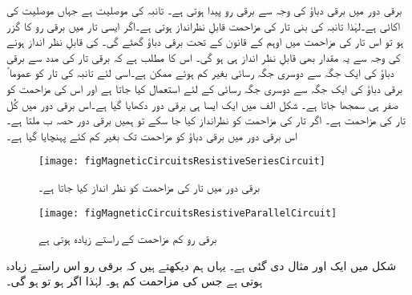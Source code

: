 	برقی دور میں برقی دباؤ    کی وجہ سے برقی رو  پیدا ہوتی ہے۔ تانبہ   کی موصلیت  ہے جہاں  موصلیت کی اکائی ہے۔لہٰذا تانبہ کی بنی تار کی مزاحمت    قابلِ نظرانداز ہوتی ہے۔اگر ایسی تار میں برقی رو  کا گزر ہو  تو اس تار کی مزاحمت میں اوہم کے قانون کے تحت  برقی دباؤ   گھٹے  گی۔ کی قابلِ نظر انداز ہونے کی وجہ سے یہ مقدار بھی قابلِ نظر انداز ہی ہو گی۔ اس کا مطلب ہے کہ برقی تار کی مدد سے برقی دباؤ کی ایک جگہ سے دوسری جگہ رسائی بغیر کم ہوئے ممکن ہے۔اسی لئے تانبہ کی تار کو عموما ً برقی دباؤ کی ایک جگہ سے دوسری جگہ رسائی کے لئے استعمال کیا جاتا ہے اور اس کی مزاحمت کو صفر ہی سمجھا جاتا ہے۔ شکل الف میں ایک ایسا ہی برقی دور دکھایا گیا ہے۔اس برقی دور میں کُل تار کی مزاحمت  ہے۔ اگر تار کی مزاحمت کو نظرانداز کیا جا سکے تو ہمیں برقی دور حصہ ب ملتا ہے۔اس برقی دور میں برقی دباؤ  کو مزاحمت  تک بغیر کم کئے پہنچایا گیا ہے۔
\begin{figure}
\centering
\texttt{[image: figMagneticCircuitsResistiveSeriesCircuit]}
\caption{برقی دور میں تار کی مزاحمت کو نظر انداز کیا جاتا ہے۔}
\label{شکل_مقناطیسی_دور_سلسہ_وار_مزاحمتی_ادوار}
\end{figure}
\begin{figure}
\centering
\texttt{[image: figMagneticCircuitsResistiveParallelCircuit]}
\caption{برقی رو کم مزاحمت کے راستے  زیادہ ہوتی ہے}
\label{شکل_مقناطیسی_دور_متوازی_مزاحمتی_دور}
\end{figure}
%

شکل   میں ایک اور مثال دی گئی ہے۔ یہاں ہم دیکھتے ہیں کہ برقی رو اس راستے زیادہ ہوتی ہے جس کی مزاحمت کم ہو۔ لہٰذا اگر ہو تو  ہو گی۔

